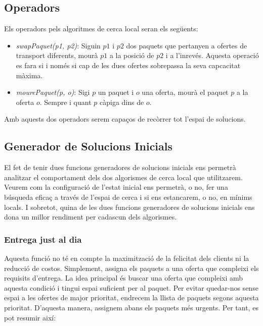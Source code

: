 \documentclass[a4paper]{article}
\begin{document}
	\subsection{Operadors}
	
	Els operadors pels algoritmes de cerca local seran els següents:
	
	\begin{itemize}
		\item \emph{swapPaquet(p1, p2)}: Siguin $p1$ i $p2$ dos paquets que pertanyen a ofertes de transport diferents, mourà $p1$ a la posició de $p2$ i a l'inrevés. Aquesta operació es fara si i només si cap de les dues ofertes sobrepassa la seva capcacitat màxima.
		\item \emph{mourePaquet(p, o)}: Sigi $p$ un paquet i $o$ una oferta, mourà el paquet $p$ a la oferta $o$. Sempre i quant $p$ càpiga dins de $o$.
	\end{itemize}
	
	Amb aquests dos operadors serem capaços de recòrrer tot l'espai de solucions.
	
	
	\subsection{Generador de Solucions Inicials}
	
	El fet de tenir dues funcions generadores de solucions inicials ens permetrà analitzar el comportament dels dos algorismes de cerca local que utilitzarem. Veurem com la configuració de l'estat inicial ens permetrà, o no, fer una búsqueda eficaç a través de l'espai de cerca i si ens estancarem, o no, en mínims locals. I sobretot, quina de les dues funcions generadores de solucions inicials ens dona un millor rendiment per cadascun dels algorismes. \\
	
	\subsubsection{Entrega just al dia}
	
	Aquesta funció no té en compte la maximització de la felicitat dels clients ni la reducció de costos. Simplement, assigna els paquets a una oferta que compleixi els requisits d'entrega. La idea principal és buscar una oferta que compleixi amb aquesta condició i tingui espai suficient per al paquet. Per evitar quedar-nos sense espai a les ofertes de major prioritat, endrecem la llista de paquets segons aquesta prioritat. D'aquesta manera, assignem abans els paquets més urgents. Per tant, es pot resumir així: \\
	
\end{document}
